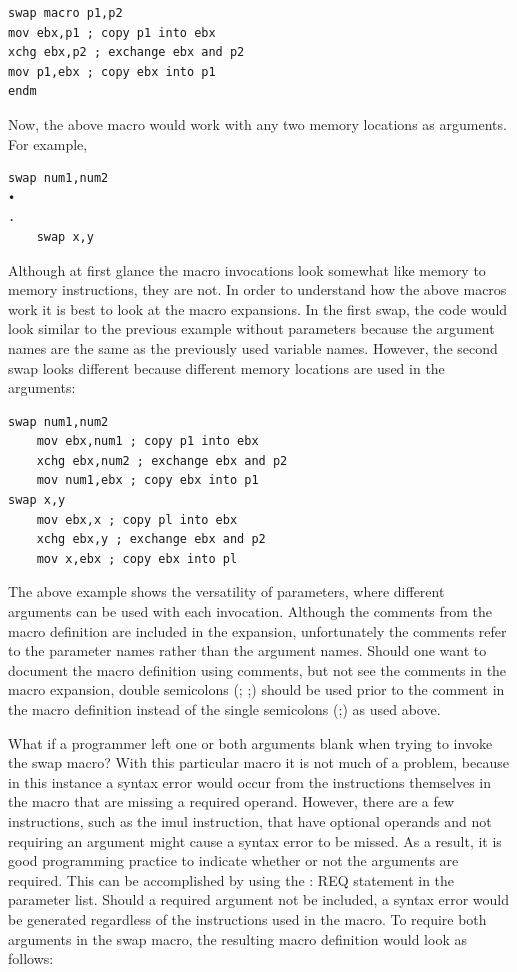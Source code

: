 \documentclass[10pt]{article}
\begin{document}
\begin{verbatim}
swap macro p1,p2
mov ebx,p1 ; copy p1 into ebx
xchg ebx,p2 ; exchange ebx and p2
mov p1,ebx ; copy ebx into p1
endm
\end{verbatim}

Now, the above macro would work with any two memory locations as arguments. For example,

\begin{verbatim}
swap num1,num2
•
.
    swap x,y
\end{verbatim}

Although at first glance the macro invocations look somewhat like memory to memory instructions, they are not. In order to understand how the above macros work it is best to look at the macro expansions. In the first swap, the code would look similar to the previous example without parameters because the argument\\
names are the same as the previously used variable names. However, the second swap looks different because different memory locations are used in the arguments:

\begin{verbatim}
swap num1,num2
    mov ebx,num1 ; copy p1 into ebx
    xchg ebx,num2 ; exchange ebx and p2
    mov num1,ebx ; copy ebx into p1
swap x,y
    mov ebx,x ; copy pl into ebx
    xchg ebx,y ; exchange ebx and p2
    mov x,ebx ; copy ebx into pl
\end{verbatim}

The above example shows the versatility of parameters, where different arguments can be used with each invocation. Although the comments from the macro definition are included in the expansion, unfortunately the comments refer to the parameter names rather than the argument names. Should one want to document the macro definition using comments, but not see the comments in the macro expansion, double semicolons (; ;) should be used prior to the comment in the macro definition instead of the single semicolons (;) as used above.

What if a programmer left one or both arguments blank when trying to invoke the swap macro? With this particular macro it is not much of a problem, because in this instance a syntax error would occur from the instructions themselves in the macro that are missing a required operand. However, there are a few instructions, such as the imul instruction, that have optional operands and not requiring an argument might cause a syntax error to be missed. As a result, it is good programming practice to indicate whether or not the arguments are required. This can be accomplished by using the : REQ statement in the parameter list. Should a required argument not be included, a syntax error would be generated regardless of the instructions used in the macro. To require both arguments in the swap macro, the resulting macro definition would look as follows:
\end{document}
